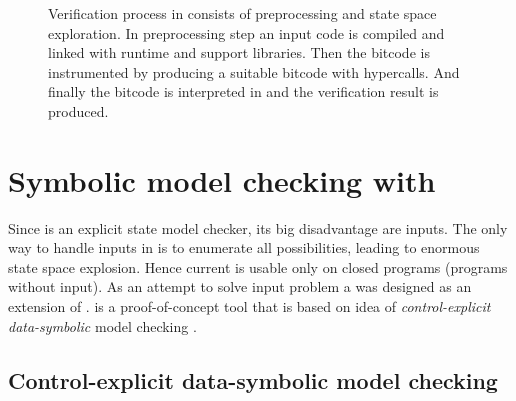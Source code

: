 \begin{figure}[!ht]
{
}
\caption{Verification process in \DIVINE consists of preprocessing and
state space exploration. In preprocessing step an input code is
compiled and linked with \DIOS runtime and \DIVINE support
libraries. Then the bitcode is instrumented by \LART producing a suitable \LLVM bitcode with \DIVM hypercalls. And finally the bitcode is interpreted in \DIVM and the verification result is produced.}\label{fig:verification}
\end{figure}

\section{Symbolic model checking with \SymDIVINE}\label{sub:symdivine}

Since \DIVINE is an explicit state model checker, its big disadvantage are inputs. The
only way to handle inputs in \DIVINE is to enumerate all possibilities, leading to
enormous state space explosion. Hence current \DIVINE is usable only on
closed programs (programs without input). As an attempt to solve input problem a
\SymDIVINE was designed as an extension of \DIVINE. \SymDIVINE is
a proof-of-concept tool that is based on idea of \emph{control-explicit data-symbolic}
model checking \cite{Barnat14}.

\subsection{Control-explicit data-symbolic model checking}


